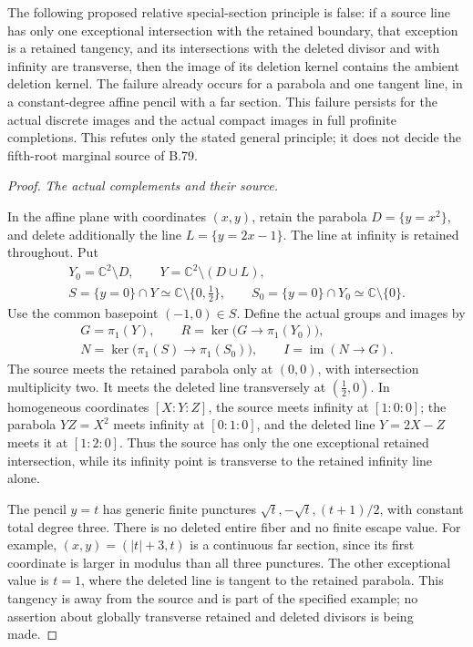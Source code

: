 The following proposed relative special-section principle is false:
if a source line has only one exceptional intersection with the retained
boundary, that exception is a retained tangency, and its intersections
with the deleted divisor and with infinity are transverse, then the
image of its deletion kernel contains the ambient deletion kernel.
The failure already occurs for a parabola and one tangent line, in a
constant-degree affine pencil with a far section. This failure persists for the actual
discrete images and the actual compact images in full profinite
completions. This refutes only the stated general principle; it does
not decide the fifth-root marginal source of B.79.

\begin{proof}
\emph{The actual complements and their source.}\par
In the affine plane with coordinates \((x,y)\), retain the parabola
\(D=\{y=x^2\}\), and delete additionally the line
\(L=\{y=2x-1\}\). The line at infinity is retained throughout.
Put
\[
\begin{gathered}
 Y_0=\mathbb C^2\setminus D,
 \qquad Y=\mathbb C^2\setminus(D\cup L),\\
 S=\{y=0\}\cap Y\simeq
           \mathbb C\setminus\{0,\tfrac12\},
 \qquad
 S_0=\{y=0\}\cap Y_0\simeq\mathbb C\setminus\{0\}.
\end{gathered}
 \tag{B.80.1}
\]
Use the common basepoint \((-1,0)\in S\). Define the actual groups and images by
\[
\begin{gathered}
 G=\pi_1(Y),\qquad
 R=\ker\bigl(G\longrightarrow\pi_1(Y_0)\bigr),\\
 N=\ker\bigl(\pi_1(S)\longrightarrow\pi_1(S_0)\bigr),
 \qquad I=\operatorname{im}(N\longrightarrow G).
\end{gathered}
 \tag{B.80.2}
\]
The source meets the retained parabola only at \((0,0)\), with
intersection multiplicity two. It meets the deleted line transversely
at \((\tfrac12,0)\). In homogeneous coordinates \([X:Y:Z]\), the
source meets infinity at \([1:0:0]\); the parabola \(YZ=X^2\) meets
infinity at \([0:1:0]\), and the deleted line \(Y=2X-Z\) meets it
at \([1:2:0]\). Thus the source has only the one exceptional retained
intersection, while its infinity point is transverse to the retained
infinity line alone.

The pencil \(y=t\) has generic finite punctures
\(\sqrt t,-\sqrt t,(t+1)/2\), with constant total degree three.
There is no deleted entire fiber and no finite escape value. For example,
\((x,y)=(|t|+3,t)\) is a continuous far section, since its first
coordinate is larger in modulus than all three punctures. The other
exceptional value is \(t=1\), where the deleted line is tangent to
the retained parabola. This tangency is away from the source and is
part of the specified example; no assertion about globally transverse
retained and deleted divisors is being made.


\end{proof}
